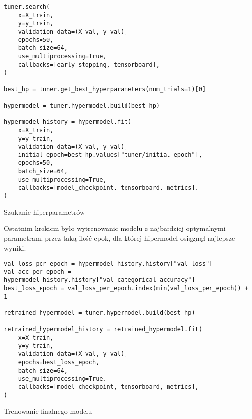 \begin{listing}[H]
    \color{white}
    \begin{verbatim}
tuner.search(
    x=X_train,
    y=y_train,
    validation_data=(X_val, y_val),
    epochs=50,
    batch_size=64,
    use_multiprocessing=True,
    callbacks=[early_stopping, tensorboard],
)

best_hp = tuner.get_best_hyperparameters(num_trials=1)[0]

hypermodel = tuner.hypermodel.build(best_hp)

hypermodel_history = hypermodel.fit(
    x=X_train,
    y=y_train,
    validation_data=(X_val, y_val),
    initial_epoch=best_hp.values["tuner/initial_epoch"],
    epochs=50,
    batch_size=64,
    use_multiprocessing=True,
    callbacks=[model_checkpoint, tensorboard, metrics],
)
    \end{verbatim}
    \caption{Szukanie hiperparametrów}
    \label{lst:hyperparameters-search}
\end{listing}

Ostatnim krokiem było wytrenowanie modelu z najbardziej optymalnymi parametrami przez taką ilość epok, dla której hipermodel osiągnął najlepsze wyniki.

\begin{listing}[H]
    \color{white}
    \begin{verbatim}
val_loss_per_epoch = hypermodel_history.history["val_loss"]
val_acc_per_epoch = hypermodel_history.history["val_categorical_accuracy"]
best_loss_epoch = val_loss_per_epoch.index(min(val_loss_per_epoch)) + 1

retrained_hypermodel = tuner.hypermodel.build(best_hp)

retrained_hypermodel_history = retrained_hypermodel.fit(
    x=X_train,
    y=y_train,
    validation_data=(X_val, y_val),
    epochs=best_loss_epoch,
    batch_size=64,
    use_multiprocessing=True,
    callbacks=[model_checkpoint, tensorboard, metrics],
)
    \end{verbatim}
    \caption{Trenowanie finalnego modelu}
    \label{lst:final-training}
\end{listing}
